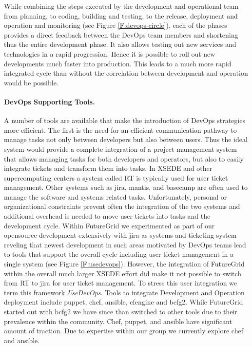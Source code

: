 \documentclass{article}
\begin{document}
While combining the steps executed by the development and operational team from planning, to coding, building and testing, to the release, deployment and operation and monitoring (see Figure \ref{F:devops-circle}), each of the phases provides a direct feedback between the DevOps team members and shortening thus the entire development phase. It also allows testing out new services and technologies in a rapid progression. Hence it is possible to roll out new developments much faster into production. This leads to a much more rapid integrated cycle than without the correlation between development and operation would be possible.

\paragraph{DevOps Supporting Tools.}

A number of tools are available that make the introduction of DevOps strategies more efficient. The first is the need for an efficient communication pathway to manage tasks not only between developers but also between users. Thus the ideal system would provide a complete integration of a project management system that allows managing tasks for both developers and operators, but also to easily integrate tickets and transform them into tasks. In XSEDE and other supercomputing centers a system called RT \cite{www-rt} is typically used for user ticket management. Other systems such as jira, mantis, and basecamp are often used to manage the software and systems related tasks. Unfortunately, personal or organizational constraints prevent often the integration of the two systems and additional overhead is needed to move user tickets into tasks and the development cycle. Within FutureGrid we experimented as part of our opensource development extensively with jira as systems and ticketing system \cite{www-jira-ticket} reveling that newest development in such areas motivated by DevOps teams lead to tools that support the overall cycle including user ticket management in a single system (see Figure \ref{F:usedevops}). However, the integration of FutureGrid within the overall much larger XSEDE effort did make it not possible to switch from RT to jira for user ticket management. To stress this user integration we term this framework {\em UseDevOps}. Tools to integrate Development and Operation deployment include puppet, chef, ansible, cfengine and bcfg2. While FutureGrid started out with bcfg2 we have since than switched to other tools due to their prevalence within the community. Chef, puppet, and ansible have significant amount of traction. Due to expertise within our group we currently explore chef and ansible.
\end{document}
